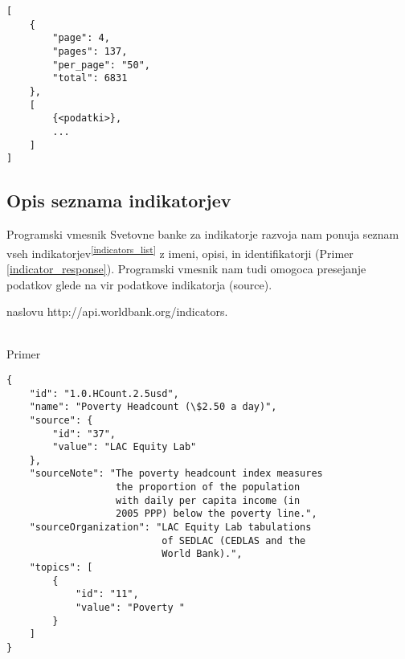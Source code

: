 \begin{snippet}
\begin{center}
\begin{lstlisting}
[
    {
    	"page": 4,
		"pages": 137,
		"per_page": "50",
		"total": 6831
    },
    [
        {<podatki>},
        ...
    ]
]
\end{lstlisting}
\end{center}
\caption{Osnovna oblika odgovora programskega vmesnika Svetovne banke v obliki
JSON, ob veljavni poizvedbi. Prvi element opisuje kolicino dobljenih in vseh 
podatkov, drugi element pa vsebuje s stranjo in stevilom podatkov na stran 
doloceni izsek celotnih podatkov.}
\label{basic_response}
\end{snippet} 



\subsection{Opis seznama indikatorjev}

Programski vmesnik Svetovne banke za indikatorje razvoja nam ponuja seznam 
vseh indikatorjev\textsuperscript{\ref{indicators_list}} z imeni, opisi, in 
identifikatorji (Primer \ref{indicator_response}). Programski vmesnik nam tudi
omogoca presejanje podatkov glede na vir podatkove indikatorja (source).

naslovu http://api.worldbank.org/indicators.

\ \\
Primer 


\begin{snippet}
\begin{center}
\begin{lstlisting}
{
    "id": "1.0.HCount.2.5usd",
    "name": "Poverty Headcount (\$2.50 a day)",
    "source": {
        "id": "37",
        "value": "LAC Equity Lab"
    },
    "sourceNote": "The poverty headcount index measures 
                   the proportion of the population
                   with daily per capita income (in 
                   2005 PPP) below the poverty line.",
    "sourceOrganization": "LAC Equity Lab tabulations
                           of SEDLAC (CEDLAS and the
                           World Bank).",
    "topics": [
        {
            "id": "11",
            "value": "Poverty "
        }
    ]
}
\end{lstlisting}
\end{center}
\caption{Podatki indikatorja stopnja revscine pri dohodku 2,5 dolarja na dan
("Poverty Headcount (\$2.50 a day)") v obliki JSON.}
\label{indicator_response}
\end{snippet} 



